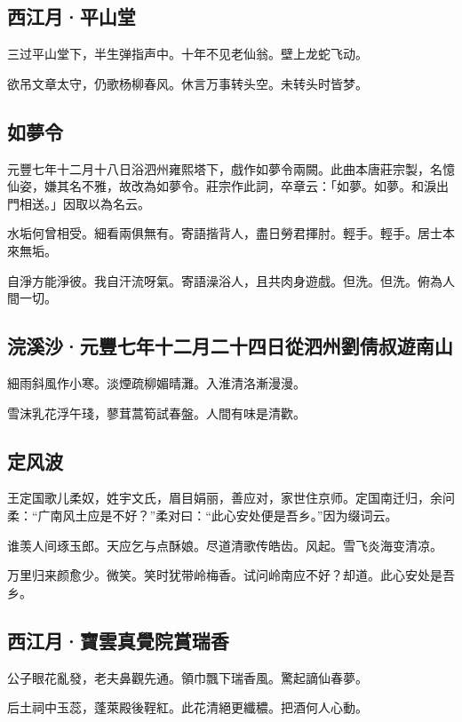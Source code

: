 \documentclass[a5paper]{ctexart}
\begin{document}
	\subsection{西江月·平山堂}
	三过平山堂下，半生弹指声中。十年不见老仙翁。壁上龙蛇飞动。
	
	欲吊文章太守，仍歌杨柳春风。休言万事转头空。未转头时皆梦。
	
	\subsection{如夢令}
	\begin{small}
		元豐七年十二月十八日浴泗州雍熙塔下，戲作如夢令兩闕。此曲本唐莊宗製，名憶仙姿，嫌其名不雅，故改為如夢令。莊宗作此詞，卒章云：「如夢。如夢。和淚出門相送。」因取以為名云。
	\end{small}
	
	水垢何曾相受。細看兩俱無有。寄語揩背人，盡日勞君揮肘。輕手。輕手。居士本來無垢。
	
	自淨方能淨彼。我自汗流呀氣。寄語澡浴人，且共肉身遊戲。但洗。但洗。俯為人間一切。
	
	\subsection{浣溪沙·元豐七年十二月二十四日從泗州劉倩叔遊南山}
	細雨斜風作小寒。淡煙疏柳媚晴灘。入淮清洛漸漫漫。
	
	雪沫乳花浮午琖，蓼茸蒿筍試春盤。人間有味是清歡。
	
	\subsection{定风波}
	\begin{small}
		王定国歌儿柔奴，姓宇文氏，眉目娟丽，善应对，家世住京师。定国南迁归，余问柔：“广南风土应是不好？”柔对曰：“此心安处便是吾乡。”因为缀词云。
	\end{small}
	
	谁羡人间琢玉郎。天应乞与点酥娘。尽道清歌传皓齿。风起。雪飞炎海变清凉。
	
	万里归来颜愈少。微笑。笑时犹带岭梅香。试问岭南应不好？却道。此心安处是吾乡。
	
	\subsection{西江月·寶雲真覺院賞瑞香}
	公子眼花亂發，老夫鼻觀先通。領巾飄下瑞香風。驚起謫仙春夢。
	
	后土祠中玉蕊，蓬萊殿後鞓紅。此花清絕更纖穠。把酒何人心動。
	
\end{document}
